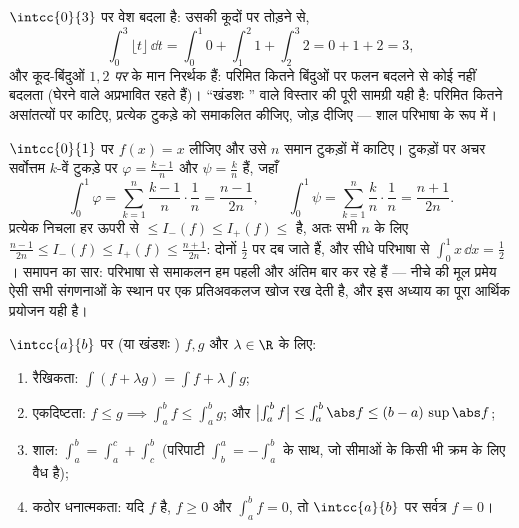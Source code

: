 \begin{example}[खंडशः संतत, बिना किसी नाटक के]\label{ex:b1:integration:piecewise}
$\intcc{0}{3}$ पर  वेश बदला  है: उसकी कूदों पर तोड़ने से,
\[
\int_0^3 \lfloor t \rfloor\,\dd t
= \int_0^1 0 + \int_1^2 1 + \int_2^3 2 = 0 + 1 + 2 = 3 ,
\]
और कूद-बिंदुओं $1, 2$ \emph{पर} के मान निरर्थक हैं: परिमित कितने बिंदुओं पर
फलन बदलने से कोई  नहीं बदलता (घेरने वाले  अप्रभावित रहते हैं)।
``खंडशः '' वाले विस्तार की पूरी सामग्री यही है: परिमित कितने असांतत्यों
पर काटिए, प्रत्येक  टुकड़े को समाकलित कीजिए, जोड़ दीजिए --- शाल परिभाषा
के रूप में।
\end{example}

\begin{example}\label{ex:b1:integration:defcompute}
$\intcc{0}{1}$ पर $f(x) = x$ लीजिए और उसे $n$ समान टुकड़ों में काटिए।
टुकड़ों पर अचर सर्वोत्तम  $k$-वें टुकड़े पर $\varphi =
\frac{k-1}{n}$ और $\psi = \frac kn$ हैं, जहाँ
\[
\int_0^1 \varphi = \sum_{k=1}^{n} \frac{k-1}{n}\cdot\frac1n
= \frac{n-1}{2n},
\qquad
\int_0^1 \psi = \sum_{k=1}^{n} \frac{k}{n}\cdot\frac1n
= \frac{n+1}{2n} .
\]
प्रत्येक निचला  हर ऊपरी से $\leq I_-(f) \leq I_+(f) \leq$ है, अतः सभी
$n$ के लिए $\frac{n-1}{2n} \leq I_-(f) \leq I_+(f) \leq \frac{n+1}{2n}$:
दोनों $\frac12$ पर दब जाते हैं, और सीधे परिभाषा से $\int_0^1 x\,\dd x =
\frac12$। समापन का सार: परिभाषा से समाकलन हम पहली और अंतिम बार कर रहे हैं
--- नीचे की मूल प्रमेय ऐसी सभी संगणनाओं के स्थान पर एक प्रतिअवकलज खोज रख
देती है, और इस अध्याय का पूरा आर्थिक प्रयोजन यही है।
\end{example}

\begin{theorem}[गुणधर्म]\label{thm:b1:integration:props}
$\intcc{a}{b}$ पर  (या खंडशः ) $f, g$ और $\lambda \in \R$ के लिए:
\begin{enumerate}
  \item रैखिकता: $\int (f + \lambda g) = \int f + \lambda \int g$;
  \item एकदिष्टता: $f \leq g \implies \int_a^b f \leq \int_a^b g$; और
  $\bigl|\int_a^b f\bigr| \leq \int_a^b \abs f \leq (b - a)\, \sup\abs f$;
  \item शाल: $\int_a^b = \int_a^c + \int_c^b$ (परिपाटी $\int_b^a =
  -\int_a^b$ के साथ, जो सीमाओं के किसी भी क्रम के लिए वैध है);
  \item कठोर धनात्मकता: यदि $f$  है, $f \geq 0$ और $\int_a^b f = 0$, तो
  $\intcc{a}{b}$ पर सर्वत्र $f = 0$।
\end{enumerate}
\end{theorem}

